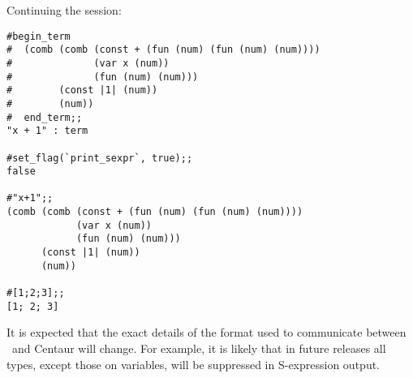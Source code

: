 \noindent Continuing the session:
\begin{session}\begin{verbatim}
#begin_term
#  (comb (comb (const + (fun (num) (fun (num) (num))))
#              (var x (num))
#              (fun (num) (num)))
#        (const |1| (num))
#        (num)) 
#  end_term;;
"x + 1" : term

#set_flag(`print_sexpr`, true);;
false 

#"x+1";;
(comb (comb (const + (fun (num) (fun (num) (num))))
            (var x (num))
            (fun (num) (num)))
      (const |1| (num))
      (num)) 
  
#[1;2;3];;
[1; 2; 3] 
\end{verbatim}\end{session}



It is expected that the exact details of the format used to
communicate between \HOL\ and Centaur will change. For example, it is
likely that in future releases all types, except those on variables,
will be suppressed in S-expression output.
